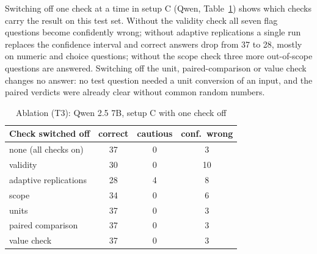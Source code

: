 Switching off one check at a time in setup C (Qwen, Table~\ref{tab:abl}) shows which checks carry the result on this test set. Without the validity check all seven flag questions become confidently wrong; without adaptive replications a single run replaces the confidence interval and correct answers drop from 37 to 28, mostly on numeric and choice questions; without the scope check three more out-of-scope questions are answered. Switching off the unit, paired-comparison or value check changes no answer: no test question needed a unit conversion of an input, and the paired verdicts were already clear without common random numbers.

\begin{table}[t]
\caption{Ablation (T3): Qwen 2.5 7B, setup C with one check off}
\label{tab:abl}
\centering\small
\begin{tabular}{@{}lccc@{}}
\toprule
Check switched off & correct & cautious & conf.\ wrong \\
\midrule
none (all checks on) & 37 & 0 & 3 \\
validity & 30 & 0 & 10 \\
adaptive replications & 28 & 4 & 8 \\
scope & 34 & 0 & 6 \\
units & 37 & 0 & 3 \\
paired comparison & 37 & 0 & 3 \\
value check & 37 & 0 & 3 \\
\bottomrule
\end{tabular}
\end{table}

